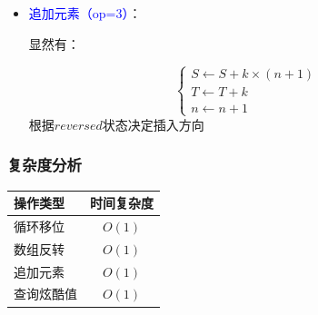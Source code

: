 \documentclass[../mainReport.tex]{subfiles} %
\begin{document}
\begin{enumerate}
\begin{itemize}
因为：

\begin{equation*}
    S'=\sum_{i=1}^na_{n-i+1}\cdot i=\sum_{j=1}^na_j\cdot(n-j+1)=(n+1)T-S\\
\end{equation*}

所以有：

\begin{equation*}
S \leftarrow (n+1) \times T - S
\end{equation*}
通过数学变换避免实际反转操作

\item \textcolor{blue}{追加元素（op=3）}：

显然有：

\begin{equation*}
\begin{cases}
S \leftarrow S + k \times (n+1) \\
T \leftarrow T + k \\
n \leftarrow n + 1
\end{cases}
\end{equation*}
根据$reversed$状态决定插入方向
\end{itemize}
\end{enumerate}

\subsubsection{复杂度分析}
\begin{table}[h]
\centering
\begin{tabular}{|l|c|}
\hline
操作类型 & 时间复杂度 \\
\hline
循环移位 & $O(1)$ \\
数组反转 & $O(1)$ \\
追加元素 & $O(1)$ \\
查询炫酷值 & $O(1)$ \\
\hline
\end{tabular}
\end{table}




\end{document}
